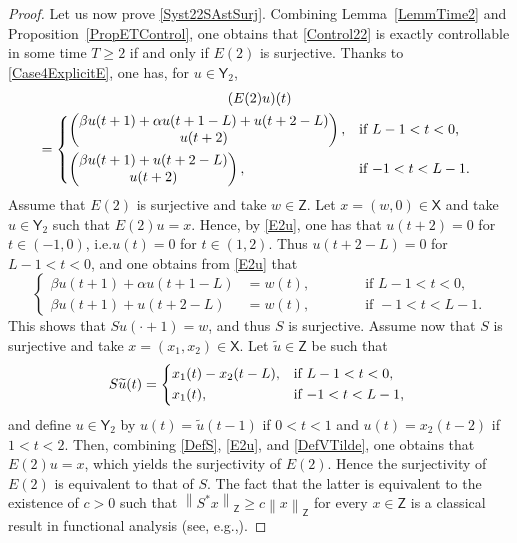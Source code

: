\documentclass[10pt]{amsart}
\providecommand{\eg}{}
\renewcommand{\eg}{e.g.,\xspace}
\theoremstyle{plain}
\theoremstyle{definition}
\newcommand{\norm}[1]{\left\lVert #1\right\lVert}
\providecommand{\ie}{i.e.}\providecommand{\etc}{etc.}\providecommand{\resp}{resp.}\providecommand{\cf}{cf.}
\begin{document}
\begin{proof}
Let us now prove \eqref{Syst22SAstSurj}. Combining Lemma~\ref{LemmTime2} and Proposition~\ref{PropETControl}, one obtains that \eqref{Control22} is exactly controllable in some time $T \geq 2$ if and only if $E(2)$ is surjective. Thanks to \eqref{Case4ExplicitE}, one has, for $u \in \mathsf Y_2$,\vspace*{-3pt}
\begin{multline}
\label{E2u}
(E(2) u)(t)\\ =
\begin{dcases*}
\begin{pmatrix}
\beta u(t + 1) + \alpha u(t + 1 - L) + u(t + 2 - L) \\
u(t + 2) \\
\end{pmatrix}, & if $L - 1 < t < 0$, \\
\begin{pmatrix}
\beta u(t + 1) + u(t + 2 - L) \\
u(t + 2) \\
\end{pmatrix}, & if $-1 < t < L - 1$.
\end{dcases*}
\end{multline}
Assume that $E(2)$ is surjective and take $w \in \mathsf Z$. Let $x = (w, 0) \in \mathsf X$ and take $u \in \mathsf Y_2$ such that $E(2) u = x$. Hence, by \eqref{E2u}, one has that $u(t + 2) = 0$ for $t \in (-1, 0)$, \ie $u(t) = 0$ for $t \in (1, 2)$. Thus $u(t + 2 - L) = 0$ for $L - 1 < t < 0$, and one obtains from \eqref{E2u} that
\[
\left\{
\begin{aligned}
\beta u(t + 1) + \alpha u(t + 1 - L) & = w(t), & \qquad & \text{ if } L - 1 < t < 0, \\
\beta u(t + 1) + u(t + 2 - L) & = w(t), & & \text{ if } -1 < t < L - 1.
\end{aligned}
\right.
\]
This shows that $S u(\cdot + 1) = w$, and thus $S$ is surjective. Assume now that $S$ is surjective and take $x = (x_1, x_2) \in \mathsf X$. Let $\widetilde u \in \mathsf Z$ be such that
\begin{equation}
\label{DefVTilde}
S \widetilde u(t) =
\begin{dcases*}
x_1(t) - x_2(t - L), & if $L - 1 < t < 0$, \\
x_1(t), & if $-1 < t < L - 1$,
\end{dcases*}
\end{equation}
and define $u \in \mathsf Y_2$ by $u(t) = \widetilde u(t - 1)$ if $0 < t < 1$ and $u(t) = x_2(t - 2)$ if $1 < t < 2$. Then, combining \eqref{DefS}, \eqref{E2u}, and \eqref{DefVTilde}, one obtains that $E(2) u = x$, which yields the surjectivity of $E(2)$. Hence the surjectivity of $E(2)$ is equivalent to that of $S$. The fact that the latter is equivalent to the existence of $c > 0$ such that $\norm{S^\ast x}_{\mathsf Z} \geq c \norm{x}_{\mathsf Z}$ for every $x \in \mathsf Z$ is a classical result in functional analysis (see, \eg \cite[Th.\,4.13]{Rudin1991Functional}).
\end{proof}
\end{document}
